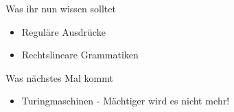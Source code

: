 



\begin{frame}	
	\begin{block}{Was ihr nun wissen solltet}
		\begin{itemize}
			\item Reguläre Ausdrücke
			\item Rechtslineare Grammatiken
		\end{itemize}
	\end{block}
	
	\begin{block}{Was nächstes Mal kommt}
		\begin{itemize}
			\item Turingmaschinen - Mächtiger wird es nicht mehr!
		\end{itemize}
	\end{block}
\end{frame}


\slideThanks

